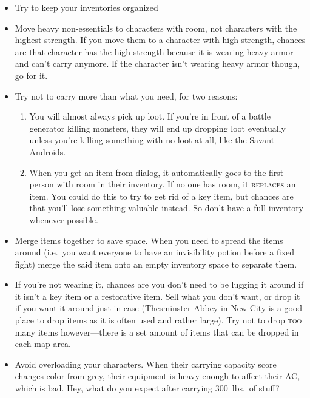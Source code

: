 \documentclass[12pt]{article}
\providecommand{\tightlist}{%
  \setlength{\itemsep}{0pt}\setlength{\parskip}{0pt}}
\newcommand{\indexPlace}[1]{\index{#1}}
\newcommand{\place}[1]{#1\indexPlace{#1}}
\newcommand\textlcsc[1]{\texorpdfstring{\textsc{\MakeLowercase{#1}}}{#1}}
\begin{document}
\begin{itemize}
\tightlist
\item
  Try to keep your inventories organized
\item
  Move heavy non-essentials to characters with room, not characters with
  the highest strength. If you move them to a character with high
  strength, chances are that character has the high strength because it
  is wearing heavy armor and can't carry anymore. If the character isn't
  wearing heavy armor though, go for it.
\item
  Try not to carry more than what you need, for two reasons:

  \begin{enumerate}
  \def\labelenumi{\arabic{enumi}.}
  \tightlist
  \item
    You will almost always pick up loot. If you're in front of a battle
    generator killing monsters, they will end up dropping loot
    eventually unless you're killing something with no loot at all, like
    the Savant Androids.
  \item
    When you get an item from dialog, it automatically goes to the first
    person with room in their inventory. If no one has room, it
    \textlcsc{REPLACES} an item. You could do this to try to get rid of a key
    item, but chances are that you'll lose something valuable instead. So
    don't have a full inventory whenever possible.
  \end{enumerate}
\item
  Merge items together to save space. When you need to spread the items
  around (i.e.\ you want everyone to have an invisibility potion before a
  fixed fight) merge the said item onto an empty inventory space to
  separate them.
\item
  If you're not wearing it, chances are you don't need to be lugging it
  around if it isn't a key item or a restorative item. Sell what you don't
  want, or drop it if you want it around just in case (Thesminster Abbey in
  \place{New City} is a good place to drop items as it is often used and
  rather large). Try not to drop \textlcsc{TOO} many items however---there is
  a set amount of items that can be dropped in each map area.
\item
  Avoid overloading your characters. When their carrying capacity score
  changes color from grey, their equipment is heavy enough to affect their
  AC, which is bad. Hey, what do you expect after carrying 300~lbs.\ of
  stuff?
\end{itemize}
\end{document}

